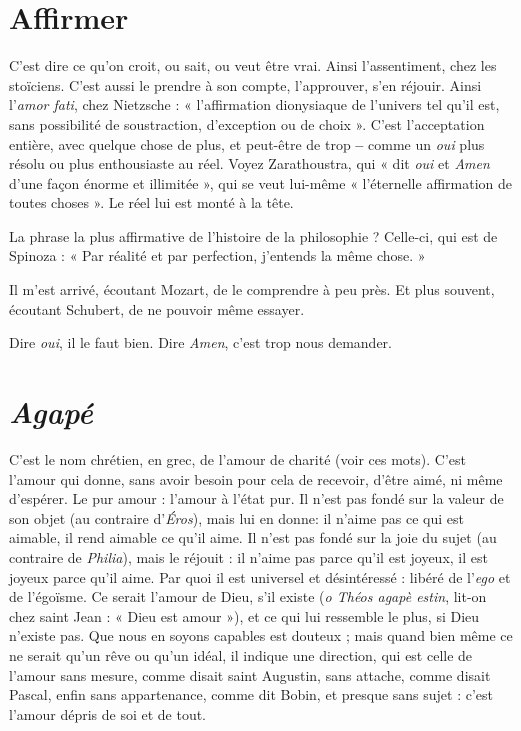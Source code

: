 \section{Affirmer}
C'est dire ce qu’on croit, ou sait, ou veut être vrai. Ainsi l’assentiment,
chez les stoïciens. C’est aussi le prendre à son compte,
l’approuver, s’en réjouir. Ainsi l’{\it amor fati}, chez Nietzsche : « l'affirmation dionysiaque
de l’univers tel qu’il est, sans possibilité de soustraction, d'exception
ou de choix ». C’est l'acceptation entière, avec quelque chose de plus, et peut-être
de trop {\bf --} comme un {\it oui} plus résolu ou plus enthousiaste au réel. Voyez
Zarathoustra, qui « dit {\it oui} et {\it Amen} d’une façon énorme et illimitée », qui se
veut lui-même « l’éternelle affirmation de toutes choses ». Le réel lui est
monté à la tête.

La phrase la plus affirmative de l’histoire de la philosophie ? Celle-ci, qui
est de Spinoza : « Par réalité et par perfection, j'entends la même chose. »

Il m'est arrivé, écoutant Mozart, de le comprendre à peu près. Et plus souvent,
écoutant Schubert, de ne pouvoir même essayer.

Dire {\it oui}, il le faut bien. Dire {\it Amen}, c’est trop nous demander.

\section{\it Agapé}
C’est le nom chrétien, en grec, de l'amour de charité (voir ces mots).
C’est l'amour qui donne, sans avoir besoin pour cela de recevoir,
d’être aimé, ni même d’espérer. Le pur amour : l’amour à l’état pur. Il n’est pas
fondé sur la valeur de son objet (au contraire d’{\it Éros}), mais lui en donne: il
n’aime pas ce qui est aimable, il rend aimable ce qu’il aime. Il n’est pas fondé
sur la joie du sujet (au contraire de {\it Philia}), mais le réjouit : il n'aime pas parce
qu'il est joyeux, il est joyeux parce qu’il aime. Par quoi il est universel et
désintéressé : libéré de l'{\it ego} et de l’égoïsme. Ce serait l'amour de Dieu, s'il
existe ({\it o Théos agapè estin}, lit-on chez saint Jean : « Dieu est amour »), et ce qui
lui ressemble le plus, si Dieu n’existe pas. Que nous en soyons capables est
douteux ; mais quand bien même ce ne serait qu’un rêve ou qu’un idéal, il
indique une direction, qui est celle de l'amour sans mesure, comme disait saint
Augustin, sans attache, comme disait Pascal, enfin sans appartenance, comme
dit Bobin, et presque sans sujet : c’est l'amour dépris de soi et de tout.

